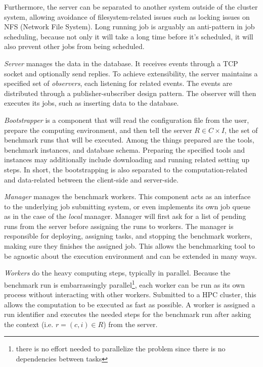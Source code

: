 Furthermore, the server can be separated to another system outside of the cluster system, allowing avoidance of filesystem-related issues such as locking issues on NFS (Network File System).
Long running job is arguably an anti-pattern in job scheduling, because not only it will take a long time before it's scheduled, it will also prevent other jobs from being scheduled.

\emph{Server} manages the data in the database.
It receives events through a TCP socket and optionally send replies.
To achieve extensibility, the server maintains a specified set of \emph{observers}, each listening for related events.
The events are distributed through a publisher-subscriber design pattern.
The observer will then executes its jobs, such as inserting data to the database.

\emph{Bootstrapper} is a component that will read the configuration file from the user, prepare the computing environment, and then tell the server $R \in C \times I$, the set of benchmark runs that will be executed.
Among the things prepared are the tools, benchmark instances, and database schema.
Preparing the specified tools and instances may additionally include downloading and running related setting up steps.
In short, the bootstrapping is also separated to the computation-related and data-related between the client-side and server-side.

\emph{Manager} manages the benchmark workers.
This component acts as an interface to the underlying job submitting system, or even implements its own job queue as in the case of the \emph{local} manager.
Manager will first ask for a list of pending runs from the server before assigning the runs to workers.
The manager is responsible for deploying, assigning tasks, and stopping the benchmark workers, making sure they finishes the assigned job.
This allows the benchmarking tool to be agnostic about the execution environment and can be extended in many ways.

\emph{Workers} do the heavy computing steps, typically in parallel.
Because the benchmark run is embarrassingly parallel\footnote{there is no effort needed to parallelize the problem since there is no dependencies between tasks}, each worker can be run as its own process without interacting with other workers.
Submitted to a HPC cluster, this allows the computation to be executed as fast as possible.
A worker is assigned a run identifier and executes the needed steps for the benchmark run after asking the context (i.e. $r = (c, i) \in R$) from the server.

